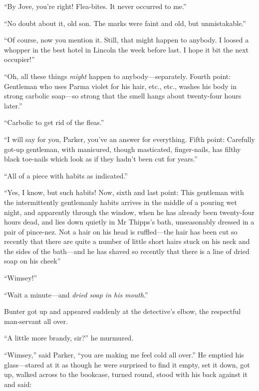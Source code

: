 \enquote{By Jove, you’re right! Flea-bites. It never occurred to me.}

\enquote{No doubt about it, old son. The marks were faint and old, but unmistakable.}

\enquote{Of course, now you mention it. Still, that might happen to anybody. I loosed a whopper in the best hotel in Lincoln the week before last. I hope it bit the next occupier!}

\enquote{Oh, all these things \textit{might} happen to anybody\allowbreak---\allowbreak separately. Fourth point: Gentleman who uses Parma violet for his hair, etc., etc., washes his body in strong carbolic soap\allowbreak---\allowbreak so strong that the smell hangs about twenty-four hours later.}

\enquote{Carbolic to get rid of the fleas.}

\enquote{I will say for you, Parker, you’ve an answer for everything. Fifth point: Carefully got-up gentleman, with manicured, though masticated, finger-nails, has filthy black toe-nails which look as if they hadn’t been cut for years.}

\enquote{All of a piece with habits as indicated.}

\enquote{Yes, I know, but such habits! Now, sixth and last point: This gentleman with the intermittently gentlemanly habits arrives in the middle of a pouring wet night, and apparently through the window, when he has already been twenty-four hours dead, and lies down quietly in Mr Thipps’s bath, unseasonably dressed in a pair of pince-nez. Not a hair on his head is ruffled\allowbreak---\allowbreak the hair has been cut so recently that there are quite a number of little short hairs stuck on his neck and the sides of the bath\allowbreak---\allowbreak and he has shaved so recently that there is a line of dried soap on his cheek\longdash}

\enquote{Wimsey!}

\enquote{Wait a minute\allowbreak---\allowbreak and \textit{dried soap in his mouth}.}

Bunter got up and appeared suddenly at the detective’s elbow, the respectful man-servant all over.

\enquote{A little more brandy, sir?} he murmured.

\enquote{Wimsey,} said Parker, \enquote{you are making me feel cold all over.} He emptied his glass\allowbreak---\allowbreak stared at it as though he were surprised to find it empty, set it down, got up, walked across to the bookcase, turned round, stood with his back against it and said:

